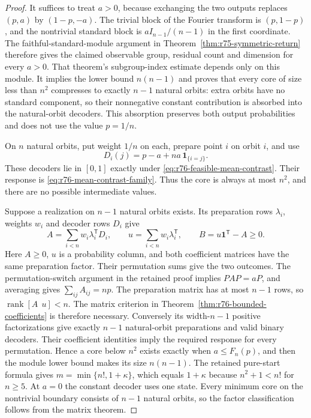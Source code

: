 \begin{proof}
It suffices to treat $a>0$, because exchanging the two outputs replaces
$(p,a)$ by $(1-p,-a)$. The trivial block of the Fourier transform is
$(p,1-p)$, and the nontrivial standard block is
$aI_{n-1}/(n-1)$ in the first coordinate. The faithful-standard-module
argument in Theorem~\ref{thm:r75-symmetric-return} therefore gives the
claimed observable group, residual count and dimension for every $a>0$.
That theorem's subgroup-index estimate depends only on this module.
It implies the lower bound $n(n-1)$ and proves that every core of size
less than $n^2$ compresses to exactly $n-1$ natural orbits: extra orbits
have no standard component, so their nonnegative constant contribution
is absorbed into the natural-orbit decoders. This absorption preserves
both output probabilities and does not use the value $p=1/n$.

On $n$ natural orbits, put weight $1/n$ on each, prepare point $i$
on orbit $i$, and use
\[
 D_i(j)=p-a+na\,\mathbf1_{\{i=j\}}.
\]
These decoders lie in $[0,1]$ exactly under
\eqref{eq:r76-feasible-mean-contrast}. Their response is
\eqref{eq:r76-mean-contrast-family}. Thus the core is always at most
$n^2$, and there are no possible intermediate values.

Suppose a realization on $n-1$ natural orbits exists. Its preparation
rows $\lambda_i$, weights $w_i$ and decoder rows $D_i$ give
\[
 A=\sum_{i<n}w_i\lambda_i^{\mathsf T}D_i,\qquad
 u=\sum_{i<n}w_i\lambda_i^{\mathsf T},\qquad
 B=u\mathbf1^{\mathsf T}-A\ge0.
\]
Here $A\ge0$, $u$ is a probability column, and both coefficient
matrices have the same preparation factor. Their permutation sums give
the two outcomes. The permutation-switch argument in the retained proof
implies $PAP=aP$, and averaging gives $\sum_{ij}A_{ij}=np$.
The preparation matrix has at most $n-1$ rows, so
$\operatorname{rank}[A\ \ u]<n$.
The matrix criterion in
Theorem~\ref{thm:r76-bounded-coefficients} is therefore necessary.
Conversely its width-$n-1$ positive factorizations give exactly
$n-1$ natural-orbit preparations and valid binary decoders.
Their coefficient identities imply the required response for every
permutation. Hence a core below $n^2$ exists exactly when $a\le F_n(p)$,
and then the module lower bound makes its size $n(n-1)$.
The retained pure-start formula gives $m=\min\{n!,1+\kappa\}$,
which equals $1+\kappa$ because $n^2+1<n!$ for $n\ge5$.
At $a=0$ the constant decoder uses one state. Every minimum core on the
nontrivial boundary consists of $n-1$ natural orbits, so the factor
classification follows from the matrix theorem.
\end{proof}

